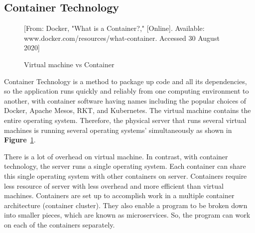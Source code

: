 \documentclass[12pt,oneside,openright,a4paper]{cpe-english-project}
\begin{document}
\subsection{Container Technology}

\begin{figure}[!h]\centering
  \setlength{\fboxrule}{0mm} %
  \setlength{\fboxsep}{0cm}
  \caption{Virtual machine vs Container}\label{fig:vmVSContainer}
  [From: Docker, "What is a Container?," [Online]. Available: www.docker.com/resources/what-container. Accessed 30 August 2020]
\end{figure}

\hspace{10mm}Container Technology is a method to package up code and all its dependencies, so the application runs quickly and reliably from one computing environment to another, with container software having names including the popular choices of Docker, Apache Mesos, RKT, and Kubernetes.  The virtual machine contains the entire operating system.  Therefore, the physical server that runs several virtual machines is running several operating systems’ simultaneously as shown in \textbf{Figure}~\ref{fig:vmVSContainer}. \cite{docker}

\hspace{10mm}There is a lot of overhead on virtual machine.  In contrast, with container technology, the server runs a single operating system.  Each container can share this single operating system with other containers on server.  Containers require less resource of server with less overhead and more efficient than virtual machines. \cite{container}   Containers are set up to accomplish work in a multiple container architecture (container cluster).  They also enable a program to be broken down into smaller pieces, which are known as microservices.  So, the program can work on each of the containers separately.

\end{document}
